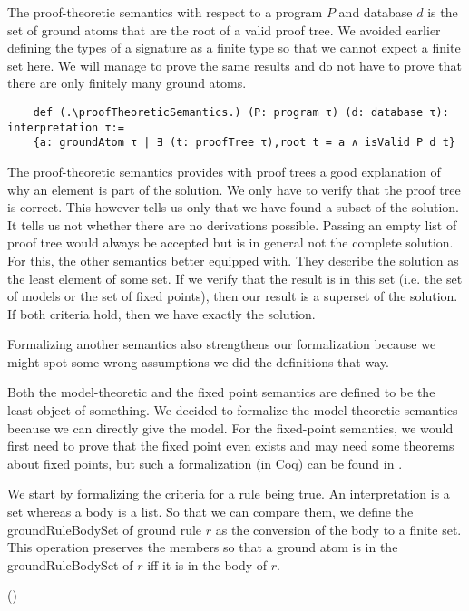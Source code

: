 The proof-theoretic semantics with respect to a program $P$ and database $d$ is the set of ground atoms that are the root of a valid proof tree. We avoided earlier defining the types of a signature as a finite type so that we cannot expect a finite set here. We will manage to prove the same results and do not have to prove that there are only finitely many ground atoms.

\begin{lstlisting}
    def (.\proofTheoreticSemantics.) (P: program τ) (d: database τ): interpretation τ:= 
    {a: groundAtom τ | ∃ (t: proofTree τ),root t = a ∧ isValid P d t}
\end{lstlisting}

The proof-theoretic semantics provides with proof trees a good explanation of why an element is part of the solution. We only have to verify that the proof tree is correct. This however tells us only that we have found a subset of the solution. It tells us not whether there are no derivations possible. Passing an empty list of proof tree would always be accepted but is in general not the complete solution. For this, the other semantics better equipped with. They describe the solution as the least element of some set. If we verify that the result is in this set (i.e. the set of models or the set of fixed points), then our result is a superset of the solution. If both criteria hold, then we have exactly the solution.

Formalizing another semantics also strengthens our formalization because we might spot some wrong assumptions we did the definitions that way.

Both the model-theoretic and the fixed point semantics are defined to be the least object of something. We decided to formalize the model-theoretic semantics because we can directly give the model. For the fixed-point semantics, we would first need to prove that the fixed point even exists and may need some theorems about fixed points, but such a formalization (in Coq) can be found in \cite{datalogCoq}.

We start by formalizing the criteria for a rule being true. An interpretation is a set whereas a body is a list. So that we can compare them, we define the groundRuleBodySet of ground rule $r$ as the conversion of the body to a finite set. This operation preserves the members so that a ground atom is in the groundRuleBodySet of $r$ iff it is in the body of $r$.


(\groundRuleBodySetiffgroundRuleBody)


